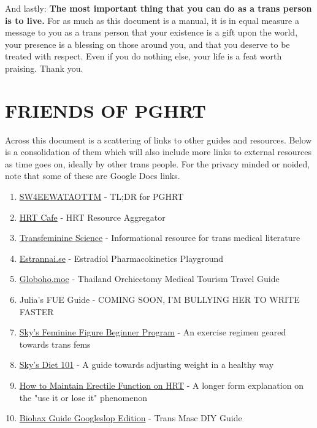 \documentclass{article}
\begin{document}
And lastly: \textbf{The most important thing that you can do as a trans person is to live.} For as much as this document is a manual, it is in equal measure a message to you as a trans person that your existence is a gift upon the world, your presence is a blessing on those around you, and that you deserve to be treated with respect. Even if you do nothing else, your life is a feat worth praising. Thank you.



\section*{FRIENDS OF PGHRT}\label{FOPGHRT}

Across this document is a scattering of links to other guides and resources. Below is a consolidation of them which will also include more links to external resources as time goes on, ideally by other trans people. For the privacy minded or noided, note that some of these are Google Docs links.

\begin{enumerate}
  \item \href{https://startwith4mgestradiolenanthateweeklyandtestatonetothreemonths.com/}{SW4EEWATAOTTM} - TL;DR for PGHRT
  \item \href{https://hrtcafe.net/}{HRT Cafe} - HRT Resource Aggregator
  \item \href{https://transfemscience.org/}{Transfeminine Science} - Informational resource for trans medical literature
  \item \href{http://estrannai.se}{Estrannai.se} - Estradiol Pharmacokinetics Playground
  \item \href{https://globoho.moe/}{Globoho.moe} - Thailand Orchiectomy Medical Tourism Travel Guide 
  \item Julia's FUE Guide - COMING SOON, I'M BULLYING HER TO WRITE FASTER
  \item \href{https://docs.google.com/document/d/1-NyE5EY5TTaRRMhk7HlTbKJ7HifjEsA4jlDO1qKQVl0/edit?tab=t.0}{Sky's Feminine Figure Beginner Program} - An exercise regimen geared towards trans fems
  \item \href{https://docs.google.com/document/d/114sztSw1aVWM2pXLDl9NrHklyvewz3EmFiHiisjM71k/edit?tab=t.0}{Sky's Diet 101} - A guide towards adjusting weight in a healthy way
  \item \href{https://stainedglasswoman.substack.com/p/how-to-maintain-your-penis-function}{How to Maintain Erectile Function on HRT} - A longer form explanation on the "use it or lose it" phenomenon
  \item \href{https://docs.google.com/document/d/1DXFxzN0XTudPZez_SO61fpqncRLPH_Be_QG_8Pcz9LU/edit?pli=1&tab=t.0}{Biohax Guide Googleslop Edition} - Trans Masc DIY Guide
\end{enumerate}
\end{document}
